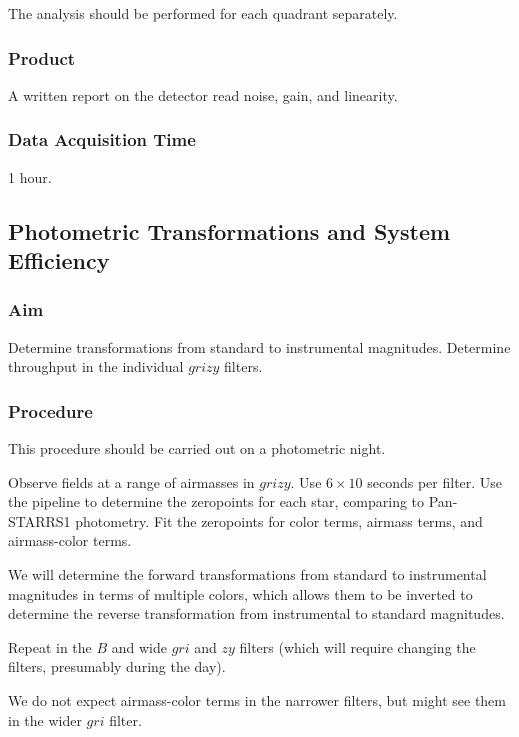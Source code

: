 \documentclass{article}
\begin{document}
The analysis should be performed for each quadrant separately.

\subsubsection{Product}

A written report on the detector read noise, gain, and linearity.

\subsubsection{Data Acquisition Time}

1 hour.


\subsection{Photometric Transformations and System Efficiency}

\subsubsection{Aim}

Determine transformations from standard to instrumental magnitudes. Determine throughput in the individual $grizy$ filters.

\subsubsection{Procedure}

This procedure should be carried out on a photometric night.

Observe fields at a range of airmasses in $grizy$. Use $6 \times 10$ seconds per filter. Use the pipeline to determine the zeropoints for each star, comparing to Pan-STARRS1 photometry. Fit the zeropoints for color terms, airmass terms, and airmass-color terms.

We will determine the forward transformations from standard to instrumental magnitudes in terms of multiple colors, which allows them to be inverted to determine the reverse transformation from instrumental to standard magnitudes.

Repeat in the $B$ and wide $gri$ and $zy$ filters (which will require changing the filters, presumably during the day).

We do not expect airmass-color terms in the narrower filters, but might see them in the wider $gri$ filter.
\end{document}

